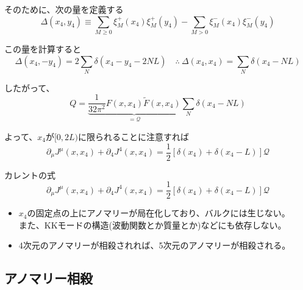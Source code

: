 \documentclass[
  unicode,a4paper,9pt,
  xcolor = {dvipsnames,svgnames},
  hyperref ={colorlinks=true,citecolor=Navy,linkcolor=NavyBlue,urlcolor=purple},
  ja=standard,lualatex
]{beamer}
\begin{document}
\begin{frame}

  そのために、次の量を定義する
  \begin{equation*}
    \Delta(x_{4},y_{4})
    \equiv
    \sum_{M\geq0}\xi_{M}^{+}(x_{4})\xi_{M}^{+}(y_{4})
    -
    \sum_{M>0}\xi_{M}^{-}(x_{4})\xi_{M}^{-}(y_{4})
  \end{equation*}

  この量を計算すると
  \begin{equation*}
    \Delta(x_{4},-y_{4})
    =
    2\sum_{N}\delta(x_{4}-y_{4}-2NL)
    \quad
    \therefore\ 
    \Delta(x_{4},x_{4})
    =
    \sum_{N}\delta(x_4-NL)
  \end{equation*}

  したがって、
  \begin{equation*}
    Q
    =
    \underbrace{
    \frac{1}{32\pi^2}F(x,x_{4})\tilde{F}(x,x_{4})
    }_{=\mathcal{Q}}
    \sum_{N}\delta(x_4-NL)
  \end{equation*}
  

  よって、$x_4$が$[0,2L)$に限られることに注意すれば
  \begin{equation*}
    \partial_{\mu}J^{\mu}(x,x_{4})
    +
    \partial_{4}J^{4}(x,x_{4})
    =
    \frac{1}{2}\left[ \delta(x_{4})+\delta(x_{4}-L) \right]\mathcal{Q}
  \end{equation*}  

\end{frame}


\begin{frame}
  
  カレントの式
  \begin{equation*}
    \partial_{\mu}J^{\mu}(x,x_{4})
    +
    \partial_{4}J^{4}(x,x_{4})
    =
    \frac{1}{2}\left[ \delta(x_{4})+\delta(x_{4}-L) \right]\mathcal{Q}
  \end{equation*}  

  \begin{itemize}
    \item 
    $x_{4}$の固定点の上にアノマリーが局在化しており、バルクには生じない。\\
    また、KKモードの構造(波動関数とか質量とか)などにも依存しない。
    \item 
    4次元のアノマリーが相殺されれば、5次元のアノマリーが相殺される。
  \end{itemize}
  
\end{frame}



\subsection{アノマリー相殺}
\end{document}
